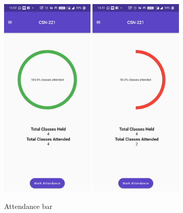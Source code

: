 \documentclass{article}
\begin{document}
\begin{figure}[H]
    \centering
    \includegraphics[width=0.40\textwidth]{AttGreenbar.jpg}
    \includegraphics[width=0.40\textwidth]{AttRedbar.jpg}
    \caption{Attendance bar}
    \label{fig:Attbar}
\end{figure}
\end{document}
